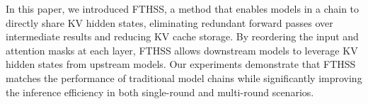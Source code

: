 In this paper, we introduced FTHSS, a method that enables models in a chain to directly share KV hidden states, eliminating redundant forward passes over intermediate results and reducing KV cache storage. By reordering the input and attention masks at each layer, FTHSS allows downstream models to leverage KV hidden states from upstream models.  Our experiments demonstrate that FTHSS matches the performance of traditional model chains while significantly improving the inference efficiency in both single-round and multi-round scenarios. 

